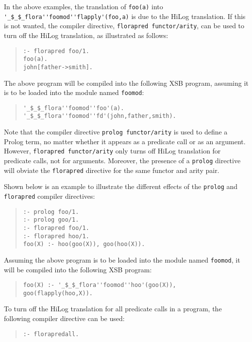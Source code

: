 \documentclass[11pt]{article}
\begin{document}
%
In the above examples, the translation of {\tt foo(a)} into
\verb|'_$_$_flora''foomod''flapply'(foo,a)| is due to the HiLog
translation. If this is not wanted, the compiler directive,
{\tt florapred functor/arity}, can be used to turn off the HiLog
translation, as illustrated as follows:
\begin{quote}
\begin{verbatim}
:- florapred foo/1.
foo(a).
john[father->smith].
\end{verbatim}
\end{quote}
The above program will be compiled into the following XSB program,
assuming it is to be loaded into the module named {\tt foomod}:
\begin{quote}
\begin{verbatim}
'_$_$_flora''foomod''foo'(a).
'_$_$_flora''foomod''fd'(john,father,smith).
\end{verbatim}
\end{quote}

Note that the compiler directive \mbox{\tt prolog functor/arity} is used
to define a Prolog term, no matter whether it appears as
a predicate call or as an argument. However, \mbox{\tt florapred functor/arity}
only turns off HiLog translation for predicate calls, not for arguments.
Moreover, the presence of a {\tt prolog} directive will obviate
the {\tt florapred} directive for the same functor and arity pair. 

Shown below is an example to illustrate the different effects of the
{\tt prolog} and {\tt florapred} compiler directives:
\begin{quote}
\begin{verbatim}
:- prolog foo/1.
:- prolog goo/1.
:- florapred foo/1.
:- florapred hoo/1.
foo(X) :- hoo(goo(X)), goo(hoo(X)).
\end{verbatim}
\end{quote}
Assuming the above program is to be loaded into the module named
{\tt foomod}, it will be compiled into the following XSB program:
\begin{quote}
\begin{verbatim}
foo(X) :- '_$_$_flora''foomod''hoo'(goo(X)), goo(flapply(hoo,X)).
\end{verbatim}
\end{quote}

%
To turn off the HiLog translation for all predicate calls in a program,
the following compiler directive can be used:
\begin{quote}
\begin{verbatim}
:- florapredall.
\end{verbatim}
\end{quote}
\end{document}
